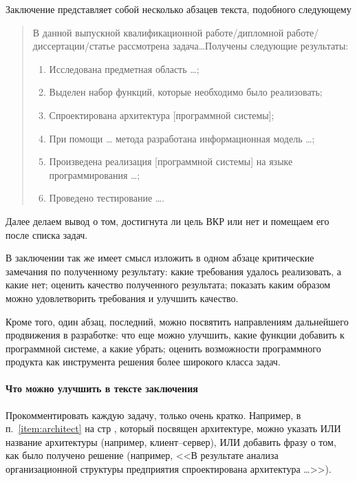 \documentclass[a4paper,14pt,final]{extreport}
\begin{document}
Заключение представляет собой несколько абзацев текста, подобного следующему
\begin{quote}
В данной выпускной квалификационной работе/дипломной работе/диссертации/статье рассмотрена задача\ldots Получены следующие результаты:
\begin{enumerate}
\item Исследована предметная область \ldots{};
\item Выделен набор функций, которые необходимо было реализовать;
\item Спроектирована архитектура [программной системы]; \label{item:architect}
\item При помощи \ldots{} метода разработана информационная модель \ldots{};
\item Произведена реализация [программной системы] на языке программирования \ldots{};
\item Проведено тестирование \ldots{}.
\end{enumerate}
\end{quote}

Далее делаем вывод о том, достигнута ли цель ВКР или нет и помещаем его после списка задач.

В заключении так же имеет смысл изложить в одном абзаце критические замечания по полученному результату: какие требования удалось реализовать, а какие нет; оценить качество полученного результата; показать каким образом можно удовлетворить требования и улучшить качество.

Кроме того, один абзац, последний, можно посвятить направлениям дальнейшего продвижения в разработке: что еще можно улучшить, какие функции добавить к программной системе, а какие убрать; оценить возможности программного продукта как инструмента решения более широкого класса задач.

\paragraph{Что можно улучшить в тексте заключения}

Прокомментировать каждую задачу, только очень кратко.  Например, в п.~\ref{item:architect} на стр \pageref{item:architect}, который посвящен архитектуре, можно указать ИЛИ название архитектуры (например, клиент--сервер), ИЛИ добавить фразу о том, как было получено решение (например, <<В результате анализа организационной структуры предприятия спроектирована архитектура \ldots{}>>).

\vspace{1em}
\end{document}
